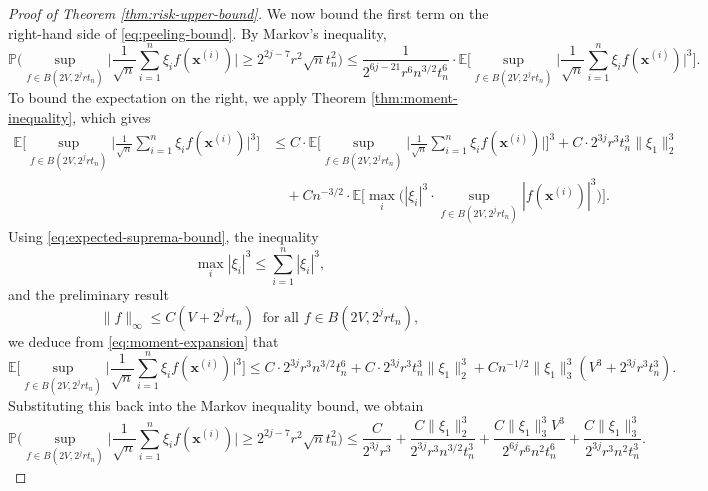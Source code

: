 \documentclass[10pt]{article}
\newcommand{\E}{{\mathbb E}}
\renewcommand{\P}{{\mathbb P}}
\newcommand{\xbf}{{\mathbf{x}}}
\begin{document}
\begin{proof}[Proof of Theorem \ref{thm:risk-upper-bound}]
We now bound the first term on the right-hand side of \eqref{eq:peeling-bound}. 
By Markov's inequality, 
\begin{equation*}
    \P\Big(\sup_{f \in B(2V, 2^j r t_n)} \Big|\frac{1}{\sqrt{n}} 
    \sum_{i = 1}^{n} \xi_i f(\xbf^{(i)})\Big| 
    \ge 2^{2j - 7} r^2 \sqrt{n}t_n^2 \Big) 
    \le \frac{1}{2^{6j - 21} r^6 n^{3/2} t_n^6} \cdot
    \E\Big[\sup_{f \in B(2V, 2^j r t_n)} \Big|\frac{1}{\sqrt{n}} 
    \sum_{i = 1}^{n} \xi_i f(\xbf^{(i)})\Big|^3 \Big]. 
\end{equation*}
To bound the expectation on the right, we apply Theorem \ref{thm:moment-inequality},
which gives
\begin{align}\label{eq:moment-expansion}
    \E\Big[\sup_{f \in B(2V, 2^j r t_n)} \Big|\frac{1}{\sqrt{n}} 
    \sum_{i = 1}^{n} \xi_i f(\xbf^{(i)})\Big|^3 \Big] 
    &\le C \cdot \E\Big[\sup_{f \in B(2V, 2^j r t_n)} \Big|\frac{1}{\sqrt{n}} 
    \sum_{i = 1}^{n} \xi_i f(\xbf^{(i)})\Big| \Big]^3
    + C \cdot 2^{3j} r^3 t_n^3 \|\xi_1\|_2^3 \nonumber \\
    &\quad + C n^{-3/2} \cdot \E \Big[\max_i \Big(|\xi_i|^3 \cdot 
    \sup_{f \in B(2V, 2^j r t_n)} |f(\xbf^{(i)})|^3 \Big)\Big].
\end{align}
Using \eqref{eq:expected-suprema-bound}, the inequality
\begin{equation*}
    \max_i |\xi_i|^3 \le \sum_{i = 1}^{n} |\xi_i|^3,
\end{equation*}
and the preliminary result
\begin{equation}\label{eq:preliminary-bound}
    \|f\|_{\infty} \le C(V + 2^j r t_n) 
    \ \text{ for all } f \in B(2V, 2^j r t_n),
\end{equation}
we deduce from \eqref{eq:moment-expansion} that
\begin{equation*}
    \E\Big[\sup_{f \in B(2V, 2^j r t_n)} \Big|\frac{1}{\sqrt{n}} 
    \sum_{i = 1}^{n} \xi_i f(\xbf^{(i)})\Big|^3 \Big]
    \le C \cdot 2^{3j} r^3 n^{3/2} t_n^6 
    + C \cdot 2^{3j} r^3 t_n^3 \|\xi_1\|_2^3 
    + C n^{-1/2} \|\xi_1\|_3^3 (V^3 + 2^{3j} r^3 t_n^3).
\end{equation*}
Substituting this back into the Markov inequality bound, we obtain
\begin{equation*}
    \P\Big(\sup_{f \in B(2V, 2^j r t_n)} \Big|\frac{1}{\sqrt{n}} 
    \sum_{i = 1}^{n} \xi_i f(\xbf^{(i)})\Big| 
    \ge 2^{2j - 7} r^2 \sqrt{n}t_n^2 \Big) 
    \le \frac{C}{2^{3j} r^3} 
    + \frac{C\|\xi_1\|_2^3}{2^{3j} r^3 n^{3/2} t_n^3} 
    + \frac{C\|\xi_1\|_3^3 V^3}{2^{6j} r^6 n^2 t_n^6} 
    + \frac{C\|\xi_1\|_3^3}{2^{3j}r^3 n^2 t_n^3}.
\end{equation*}
    

\end{proof}
\end{document}
